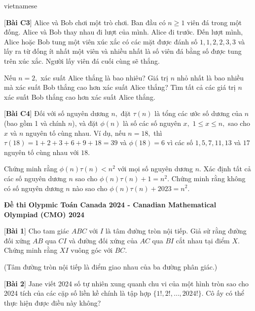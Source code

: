 \documentclass{article}
\begin{document}
\begin{otherlanguage*}{vietnamese}
\begin{problem*}{[\textbf{Bài C3}]}
    Alice và Bob chơi một trò chơi. Ban đầu có $n \ge 1$ viên đá trong một đống. 
    Alice và Bob thay nhau đi lượt của mình. Alice đi trước.
    Đến lượt mình, Alice hoặc Bob tung một viên xúc xắc có các mặt được đánh số $1, 1, 2, 2, 3, 3$ và lấy ra từ đống ít nhất một viên và nhiều nhất là số viên đá bằng số được tung trên xúc xắc.
    Người lấy viên đá cuối cùng sẽ thắng.
    \begin{enumerate}[topsep=0pt, partopsep=0pt, itemsep=0pt]
        \ii Nếu $n = 2,$ xác suất Alice thắng là bao nhiêu?
        \ii Giá trị $n$ nhỏ nhất là bao nhiều mà xác suất Bob thắng cao hơn xác suất Alice thắng?
        \ii Tìm tất cả các giá trị $n$ xác suất Bob thắng cao hơn xác suất Alice thắng.
    \end{enumerate}
\end{problem*}

\begin{problem*}{[\textbf{Bài C4}]}
    Đối với số nguyên dương $n,$ đặt $\tau(n)$ là tổng các ước số dương của $n$ (bao gồm 1 và chính $n$), và đặt $\phi(n)$ là số các số nguyên $x,$ $1 \le x \le n,$ sao cho $x$ và $n$ nguyên tố cùng nhau.
    Ví dụ, nếu $n = 18,$ thì $\tau(18) = 1 + 2 + 3 + 6 + 9 + 18 = 39$ và $\phi(18) = 6$ vì các số $1, 5, 7, 11, 13$ và $17$ nguyên tố cùng nhau với $18.$

    \begin{enumerate}[topsep=0pt, partopsep=0pt, itemsep=0pt]
        \ii Chứng minh rằng $\phi(n) \tau(n) < n^2$ với mọi số nguyên dương $n.$
        \ii Xác định tất cả các số nguyên dương $n$ sao cho $\phi(n) \tau(n) + 1 = n^2.$
        \ii Chứng minh rằng không có số nguyên dương $n$ nào sao cho $\phi(n) \tau(n) + 2023 = n^2.$
    \end{enumerate}
\end{problem*}

\newpage
\textbf{Đề thi Olypmic Toán Canada 2024 - Canadian Mathematical Olympiad (CMO) 2024}

\begin{problem*}{[\textbf{Bài 1}]}
    Cho tam giác $ABC$ với $I$ là tâm đường tròn nội tiếp. Giả sử rằng đường đối xứng $AB$ qua $CI$ và
    đường đối xứng của $AC$ qua $BI$ cắt nhau tại điểm $X.$ Chứng minh rằng $XI$ vuông góc với $BC.$

    (Tâm đường tròn nội tiếp là điểm giao nhau của ba đường phân giác.)
\end{problem*}

\begin{problem*}{[\textbf{Bài 2}]}
    Jane viết 2024 số tự nhiên xung quanh chu vi của một hình tròn sao cho 2024 tích của các cặp số liền kề chính là tập hợp $\{1!,2!, \ldots, 2024!\}.$
    Cô ấy có thể thực hiện được điều này không?
\end{problem*}


\end{otherlanguage*}
\end{document}
